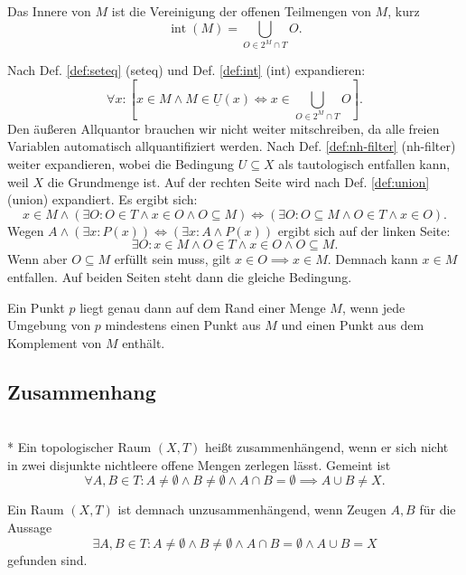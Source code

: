 \begin{Satz}
Das Innere von $M$ ist die Vereinigung der offenen Teilmengen
von $M$, kurz%
\[\operatorname{int}(M) = \bigcup_{O\in 2^M\cap T} O.\]
\end{Satz}

\begin{Beweis}
Nach Def. \ref{def:seteq} (seteq) und Def. \ref{def:int} (int)
expandieren:%
\[\forall x\colon [x\in M\land M\in\underline U(x)
\iff x\in\bigcup_{O\in 2^M\cap T} O].\]
Den äußeren Allquantor brauchen wir nicht weiter mitschreiben, da alle
freien Variablen automatisch allquantifiziert werden.
Nach Def. \ref{def:nh-filter} (nh-filter) weiter expandieren, wobei die
Bedingung $U\subseteq X$ als tautologisch entfallen kann,
weil $X$ die Grundmenge ist. Auf der rechten Seite wird nach Def.
\ref{def:union} (union) expandiert. Es ergibt sich:
\[x\in M\land (\exists O\colon O\in T\land x\in O\land O\subseteq M)
\iff (\exists O\colon O\subseteq M\land O\in T\land x\in O).\]
Wegen $A\land(\exists x\colon P(x))\iff (\exists x\colon A\land P(x))$ ergibt
sich auf der linken Seite:
\[\exists O\colon x\in M\land O\in T\land x\in O\land O\subseteq M.\]
Wenn aber $O\subseteq M$ erfüllt sein muss, gilt
$x\in O\implies x\in M$. Demnach kann $x\in M$ entfallen.
Auf beiden Seiten steht dann die gleiche Bedingung.\,\qedsymbol
\end{Beweis}

\begin{Satz}\label{boundary-point-char}
Ein Punkt $p$ liegt genau dann auf dem Rand einer Menge $M$, wenn
jede Umgebung von $p$ mindestens einen Punkt aus $M$ und
einen Punkt aus dem Komplement von $M$ enthält.
\end{Satz}

\newpage
\subsection{Zusammenhang}

\begin{Definition}\mbox{}\\*
Ein topologischer Raum $(X,T)$ heißt zusammenhängend, wenn er sich
nicht in zwei disjunkte nichtleere offene Mengen zerlegen lässt. Gemeint ist
\[\forall A,B\in T\colon A\ne\emptyset\land B\ne\emptyset\land A\cap B = \emptyset \implies A\cup B\ne X.\]
\end{Definition}
 Ein Raum $(X,T)$ ist demnach unzusammenhängend, wenn
Zeugen $A,B$ für die Aussage
\[\exists A,B\in T\colon A\ne\emptyset\land B\ne\emptyset\land A\cap B = \emptyset \land A\cup B = X\]
gefunden sind.

